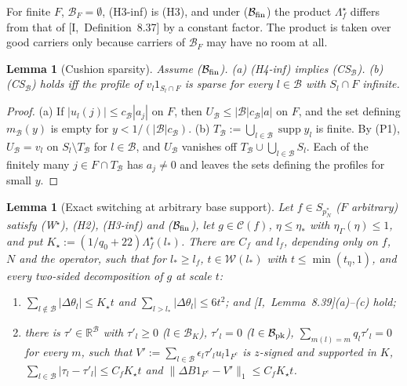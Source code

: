 \documentclass[10pt]{amsart}
\newtheorem{lemma}[theorem]{Lemma}
\theoremstyle{definition}
\theoremstyle{remark}
\newcommand{\supp}{\operatorname{supp}}
\newcommand{\R}{\mathbb R}
\newcommand{\Cset}{\mathcal C}
\begin{document}
For finite $F$, $\mathcal B_F=\emptyset$, (H3-inf) is (H3), and under
($\mathcal B_{\rm fin}$) the product $\Lambda^\star_f$ differs from that of
[I,~Definition~8.37] by a constant factor.  The product is taken over good
carriers only because carriers of $\mathcal B_F$ may have no room at all.

\begin{lemma}[Cushion sparsity]\label{lem:II-R0}
Assume \textup{($\mathcal B_{\rm fin}$)}.  \textup{(a)} \textup{(H4-inf)}
implies \textup{(CS$_{\mathcal B}$)}.  \textup{(b)} \textup{(CS$_{\mathcal
B}$)} holds iff the profile of $v_l1_{S_l\cap F}$ is sparse for every
$l\in\mathcal B$ with $S_l\cap F$ infinite.
\end{lemma}

\begin{proof}
(a) If $|u_l(j)|\le c_{\mathcal B}|a_j|$ on $F$, then $U_{\mathcal B}\le
|\mathcal B|c_{\mathcal B}|a|$ on $F$, and the set defining
$m_{\mathcal B}(y)$ is empty for $y<1/(|\mathcal B|c_{\mathcal B})$.
(b) $T_{\mathcal B}:=\bigcup_{l\in\mathcal B}\supp y_l$ is finite.  By (P1),
$U_{\mathcal B}=v_l$ on $S_l\setminus T_{\mathcal B}$ for $l\in\mathcal B$,
and $U_{\mathcal B}$ vanishes off $T_{\mathcal B}\cup\bigcup_{l\in\mathcal B}
S_l$.  Each of the finitely many $j\in F\cap T_{\mathcal B}$ has $a_j\ne0$
and leaves the sets defining the profiles for small $y$.
\end{proof}

\begin{lemma}[Exact switching at arbitrary base support]
\label{lem:II-exactswitchinf}
Let $f\in S_{p_N^*}$ \textup{(}$F$ arbitrary\textup{)} satisfy
\textup{(W$^\star$)}, \textup{(H2)}, \textup{(H3-inf)} and
\textup{($\mathcal B_{\rm fin}$)}, let $g\in\Cset(f)$, $\eta\le\eta_*$ with
$\eta_\Gamma(\eta)\le1$, and put $K_\star:=(1/q_0+22)\Lambda^\star_f(l_*)$.
There are $C_f$ and $l_f$, depending only on $f$, $N$ and the operator,
such that for $l_*\ge l_f$, $t\in\mathcal W(l_*)$ with $t\le\min(t_\eta,1)$,
and every two-sided decomposition of $g$ at scale $t$:
\begin{enumerate}
\item[(a)] $\sum_{l\notin\mathcal B}|\Delta\theta_l|\le K_\star t$ and
$\sum_{l>l_*}|\Delta\theta_l|\le6t^2$; and [I,~Lemma~8.39](a)--(c) hold;
\item[(b)] there is $\tau'\in\R^{\mathcal B}$ with $\tau'_l\ge0$
\textup{(}$l\in\mathcal B_K$\textup{)}, $\tau'_l=0$ \textup{(}$l\in\mathcal
B_{\rm pk}$\textup{)}, $\sum_{m(l)=m}q_l\tau'_l=0$ for every $m$,
such that $V':=\sum_{l\in\mathcal B}\epsilon_l\tau'_lu_l1_{F^c}$ is
$z$-signed and supported in $K$, $\sum_{l\in\mathcal B}|\tau_l-\tau'_l|\le
C_fK_\star t$ and $\|\Delta B1_{F^c}-V'\|_1\le C_fK_\star t$.
\end{enumerate}
\end{lemma}
\end{document}
